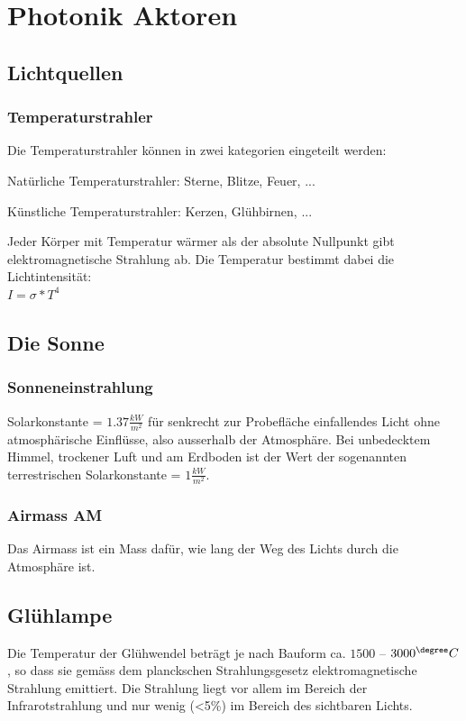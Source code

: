 \section{Photonik Aktoren}
\subsection{Lichtquellen}
\subsubsection{Temperaturstrahler}

   
    Die Temperaturstrahler können in zwei kategorien eingeteilt werden:
    \begin{compactitem}
        \item Natürliche Temperaturstrahler: Sterne, Blitze, Feuer, ...
        \item Künstliche Temperaturstrahler: Kerzen, Glühbirnen, ... 
    \end{compactitem}
    Jeder Körper mit Temperatur wärmer als der absolute Nullpunkt gibt elektromagnetische Strahlung ab.
    Die Temperatur bestimmt dabei die Lichtintensität: \\ $I=\sigma*T^4$


\subsection{Die Sonne}
\subsubsection{Sonneneinstrahlung}
Solarkonstante = $1.37 \frac{kW}{m^2}$ für senkrecht zur Probefläche einfallendes Licht ohne atmosphärische Einflüsse, also ausserhalb der Atmosphäre. Bei unbedecktem Himmel, trockener Luft und am Erdboden ist der Wert der sogenannten terrestrischen Solarkonstante = $1 \frac{kW}{m^2}$.

\subsubsection{Airmass AM}
Das Airmass ist ein Mass dafür, wie lang der Weg des Lichts durch die Atmosphäre ist.

\subsection{Glühlampe}
Die Temperatur der Glühwendel beträgt je nach Bauform ca. $1500$ – $3000^\degree C$, so dass sie gemäss dem planckschen Strahlungsgesetz elektromagnetische Strahlung emittiert. Die Strahlung liegt vor allem im Bereich der Infrarotstrahlung und nur wenig (\textless5\%) im Bereich des sichtbaren Lichts.


